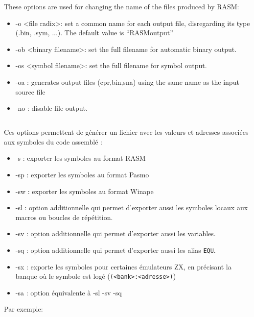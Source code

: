 \begin{xen}
	These options are used for changing the name of the files produced by RASM:
  \begin{itemize}
    \item -o \textless file radix\textgreater	: set a common name for each output file, disregarding its type (.bin, .sym, ...).
    The default value is “RASMoutput”
    \item -ob \textless binary filename\textgreater	: set the full filename for automatic binary output.
    \item -os \textless symbol filename\textgreater	: set the full filename for symbol output.
    \item -oa : generates output files (cpr,bin,sna) using the same name as the input source file
    \item -no : disable file output.
  \end{itemize}
\end{xen}


\subsection{}

\begin{xfr}
  Ces options permettent de générer un fichier avec les valeurs et adresses associées aux symboles du code assemblé :
  \begin{itemize}
    \item -s : exporter les symboles au format RASM
    \item -sp	: exporter les symboles au format Pasmo
    \item -sw : exporter les symboles au format Winape
    \item -sl :	option additionnelle qui permet d'exporter aussi les symboles locaux aux macros ou boucles de répétition.
    \item -sv :	option additionnelle qui permet d'exporter aussi les variables.
    \item -sq :	option additionnelle qui permet d'exporter aussi les alias \texttt{EQU}.
    \item -sx : exporte les symboles pour certaines émulateurs ZX, en précisant la banque où le symbole est logé (\texttt{(<bank>:<adresse>)})
    \item -sa :	option équivalente à -sl -sv -sq

  \end{itemize}
  Par exemple:
\end{xfr}


